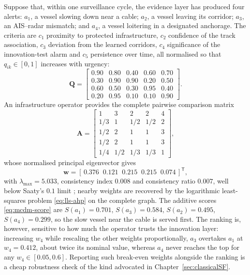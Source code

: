 \begin{example}
\label{ex:ch07-maritime-mcdm}
Suppose that, within one surveillance cycle, the evidence layer has produced four alerts: $a_1$, a vessel slowing down near a cable; $a_2$, a vessel leaving its corridor; $a_3$, an AIS--radar mismatch; and $a_4$, a vessel loitering in a designated anchorage. The criteria are $c_1$ proximity to protected infrastructure, $c_2$ confidence of the track association, $c_3$ deviation from the learned corridors, $c_4$ significance of the innovation-test alarm and $c_5$ persistence over time, all normalised so that $q_{ik}\in[0,1]$ increases with urgency:
\begin{equation}
\mathbf{Q}=
\begin{bmatrix}
0.90 & 0.80 & 0.40 & 0.60 & 0.70\\
0.30 & 0.90 & 0.90 & 0.20 & 0.50\\
0.60 & 0.50 & 0.30 & 0.95 & 0.40\\
0.20 & 0.95 & 0.10 & 0.10 & 0.90
\end{bmatrix}.
\end{equation}
An infrastructure operator provides the complete pairwise comparison matrix
\begin{equation}
\mathbf{A}=
\begin{bmatrix}
1 & 3 & 2 & 2 & 4\\
1/3 & 1 & 1/2 & 1/2 & 2\\
1/2 & 2 & 1 & 1 & 3\\
1/2 & 2 & 1 & 1 & 3\\
1/4 & 1/2 & 1/3 & 1/3 & 1
\end{bmatrix},
\end{equation}
whose normalised principal eigenvector gives
\[\mathbf{w}=[\,0.376\;\;0.121\;\;0.215\;\;0.215\;\;0.074\,]^{\mathsf T},\]
with $\lambda_{\max}=5.033$, consistency index $0.008$ and consistency ratio $0.007$, well below Saaty's $0.1$ limit \cite{saaty_analytic_1987}; nearby weights are recovered by the logarithmic least-squares problem \eqref{eq:lls-ahp} on the complete graph. The additive scores \eqref{eq:mcdm-score} are $S(a_1)=0.701$, $S(a_3)=0.584$, $S(a_2)=0.495$, $S(a_4)=0.299$, so the slow vessel near the cable is served first. The ranking is, however, sensitive to how much the operator trusts the innovation layer: increasing $w_4$ while rescaling the other weights proportionally, $a_3$ overtakes $a_1$ at $w_4=0.412$, about twice its nominal value, whereas $a_4$ never reaches the top for any $w_4\in[0.05,0.6]$. Reporting such break-even weights alongside the ranking is a cheap robustness check of the kind advocated in Chapter~\ref{sec:classicalSF}.
\end{example}


